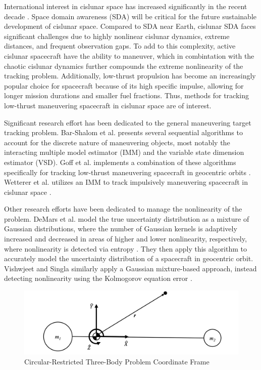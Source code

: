 \documentclass[letterpaper, preprint, paper,11pt]{AAS}	%
\begin{document}
International interest in cislunar space has increased significantly in the recent decade \cite{nelson2024moon}. Space domain awareness (SDA) will be critical for the future sustainable development of cislunar space. Compared to SDA near Earth, cislunar SDA faces significant challenges due to highly nonlinear cislunar dynamics, extreme distances, and frequent observation gaps. To add to this complexity, active cislunar spacecraft have the ability to maneuver, which in combintation with the chaotic cislunar dynamics further compounds the extreme nonlinearity of the tracking problem. Additionally, low-thrust propulsion has become an increasingly popular choice for spacecraft because of its high specific impulse, allowing for longer mission durations and smaller fuel fractions. Thus, methods for tracking low-thrust maneuvering spacecraft in cislunar space are of interest. 

Significant research effort has been dedicated to the general maneuvering target tracking problem. Bar-Shalom et al. presents several sequential algorithms to account for the discrete nature of maneuvering objects, most notably the interacting multiple model estimator \cite{bar1989tracking} (IMM) and the variable state dimension estimator \cite{bar2007variable} (VSD). Goff et al. implements a combination of these algorithms specifically for tracking low-thrust maneuvering spacecraft in geocentric orbits \cite{goff2015orbit}. Wetterer et al. utilizes an IMM to track impulsively maneuvering spacecraft in cislunar space \cite{wetterer2022cislunar}.

Other research efforts have been dedicated to manage the nonlinearity of the problem. DeMars et al. model the true uncertainty distribution as a mixture of Gaussian distributions, where the number of Gaussian kernels is adaptively increased and decreased in areas of higher and lower nonlinearity, respectively, where nonlinearity is detected via entropy \cite{demars2013entropy}. They then apply this algorithm to accurately model the uncertainty distribution of a spacecraft in geocentric orbit. Vishwjeet and Singla similarly apply a Gaussian mixture-based approach, instead detecting nonlinearity using the Kolmogorov equation error \cite{vishwajet2018adaptive}. 

\begin{figure}
    \centering
    \includegraphics[width=1\linewidth]{Figures/CR3BP.png}
    \caption{Circular-Restricted Three-Body Problem Coordinate Frame}
    \label{fig:CR3BP}
\end{figure}
\end{document}
